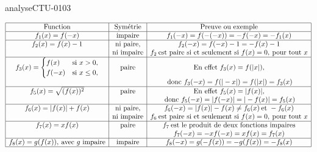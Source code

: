 \begin{corrige}{analyseCTU-0103}
\begin{enumerate}
\begin{equation*}
        \begin{array}{|c|c|c|}
         \hline
         \text{Function} & \text{Sym\'etrie} & \text{Preuve ou exemple}\\
          \hline
            f_1 (x) = f(-x) & \text{impaire} & f_1 (-x) = f(-(-x)) = -f(-x) = -f_1(x) \\
            \hline
            f_2 (x) = f(x)-1 & \text{ ni paire, } & f_2 (-x) = f(-x)-1 =-f(x)-1  \\
&\text{ni impaire}&f_2 \:\text{est paire si et seulement si } f (x) = 0, \:\text{pour tout }x\\
            \hline
            f_3 (x)= 
            \begin{cases}
              f(x) &\text{si } x>0, \\
              f(-x)& \text{si } x\leq 0,
            \end{cases} &\text{paire} & \text{En effet } f_3(x) = f(|x|),\\
            && \:\text{donc } f_3(-x) = f(|-x|)= f(|x|) = f_3 (x) \\
            \hline
            f_5(x) = \sqrt{(f(x))^2} &\text{paire}& \text{En effet } f_5(x) = |f(x)|,\\
            && \:\text{donc } f_5(-x) = |f(-x)| = |-f(x)| = f_5(x)\\
            \hline
            f_6(x)= |f(x)| + f(x) &\text{ ni paire, }& f_6(-x) = |f(x)| - f(x) \neq f_6(x)\:\text{et } -f_6(x)  \\
&\text{ni impaire} & f_6 \:\text{est paire si et seulement si } f (x) = 0, \:\text{pour tout }x\\
            \hline
            f_7(x) = xf(x)&\text{paire}& f_7 \: \text{est le produit de deux fonctions impaires} \\
            &&f_7(-x) = -xf(-x) = xf(x) = f_7(x)\\
            \hline
            f_8(x) = g(f(x)), \:\text{avec }g \text{ impaire}   &\text{impaire}& f_8(-x) = g(-f(x))= -g(f(x))=-f_8(x) \\
\hline
        \end{array}
      \end{equation*}
  \end{enumerate} 
\end{corrige}
